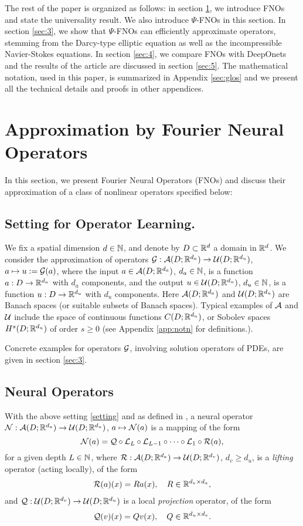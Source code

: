 \documentclass[reqno,a4paper]{amsart}
\begin{document}
The rest of the paper is organized as follows: in section \ref{sec:2}, we introduce FNOs and state the universality result. We also introduce $\Psi$-FNOs in this section. In section \ref{sec:3}, we show that $\Psi$-FNOs can efficiently approximate operators, stemming from the Darcy-type elliptic equation as well as the incompressible Navier-Stokes equations. In section \ref{sec:4}, we compare FNOs with DeepOnets and the results of the article are discussed in section \ref{sec:5}. The mathematical notation, used in this paper, is summarized in Appendix \ref{sec:glos} and we present all the technical details and proofs in other appendices. 
\section{Approximation by Fourier Neural Operators}
\label{sec:2}
In this section, we present Fourier Neural Operators (FNOs) and discuss their approximation of a class of nonlinear operators specified below:
\subsection{Setting for Operator Learning.}
\begin{setting} 
\label{setting}
We fix a spatial dimension $d\in \mathbb{N}$, and denote by $D \subset \mathbb{R}^d$ a domain in $\mathbb{R}^d$. We consider the approximation of operators $\mathcal{G}: \mathcal{A}(D;\mathbb{R}^{d_a}) \to \mathcal{U}(D;\mathbb{R}^{d_u})$, $a \mapsto u := \mathcal{G}(a)$, where the input $a \in \mathcal{A}(D;\mathbb{R}^{d_a})$, $d_a\in\mathbb{N}$, is a function $a: D \to \mathbb{R}^{d_a}$ with $d_a$ components, and the output $u \in \mathcal{U}(D;\mathbb{R}^{d_u})$, $d_u\in \mathbb{N}$, is a function $u: D \to \mathbb{R}^{d_u}$ with $d_u$ components. Here $\mathcal{A}(D;\mathbb{R}^{d_a})$ and $\mathcal{U}(D;\mathbb{R}^{d_u})$ are Banach spaces (or suitable subsets of Banach spaces). Typical examples of $\mathcal{A}$ and $\mathcal{U}$ include the space of continuous functions $C(D;\mathbb{R}^{d_u})$, or Sobolev spaces $H^s(D;\mathbb{R}^{d_u})$ of order $s \ge 0$  (see Appendix \ref{app:notn} for definitions.).  
\end{setting}
Concrete examples for operators $\mathcal{G}$, involving solution operators of PDEs, are given in section \ref{sec:3}. 
\subsection{Neural Operators}
With the above setting \ref{setting} and as defined in \cite{li2020neural}, a neural operator $\mathcal{N}: \mathcal{A}(D;\mathbb{R}^{d_a}) \to \mathcal{U}(D;\mathbb{R}^{d_u})$, $a\mapsto \mathcal{N}(a)$ is a mapping of the form 
\[
\mathcal{N}(a) = \mathcal{Q} \circ \mathcal{L}_L \circ \mathcal{L}_{L-1} \circ \dots \circ \mathcal{L}_{1} \circ \mathcal{R}(a),
\]
for a given depth $L\in \mathbb{N}$, where $\mathcal{R}: \mathcal{A}(D;\mathbb{R}^{d_a}) \to \mathcal{U}(D;\mathbb{R}^{d_v})$, $d_v \ge d_u$, is a \emph{lifting} operator (acting locally), of the form
\begin{align} \label{eq:no-r}
\mathcal{R}(a)(x) = R a(x), 
\quad 
R \in \mathbb{R}^{d_v\times d_a},
\end{align}
and $\mathcal{Q}: \mathcal{U}(D;\mathbb{R}^{d_v}) \to \mathcal{U}(D;\mathbb{R}^{d_u})$ is a local \emph{projection} operator, of the form 
\begin{align} \label{eq:no-q}
\mathcal{Q}(v)(x) = Qv(x), 
\quad
Q \in \mathbb{R}^{d_u \times d_v}.
\end{align}
\end{document}
